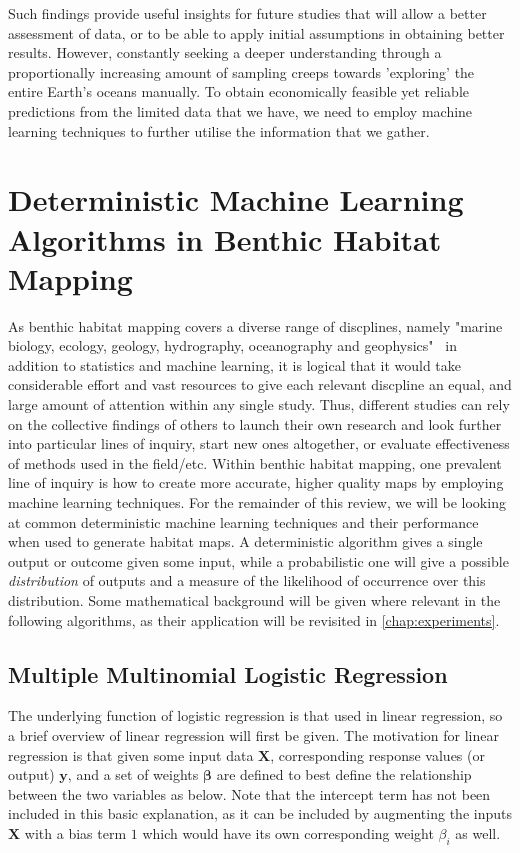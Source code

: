 Such findings provide useful insights for future studies that will allow a better assessment of data, or to be able to apply initial assumptions in obtaining better results. However, constantly seeking a deeper understanding through a proportionally increasing amount of sampling creeps towards 'exploring' the entire Earth's oceans manually. To obtain economically feasible yet reliable predictions from the limited data that we have, we need to employ machine learning techniques to further utilise the information that we gather.

\section{Deterministic Machine Learning Algorithms in Benthic Habitat Mapping}
As benthic habitat mapping covers a diverse range of discplines, namely "marine biology, ecology, geology, hydrography, oceanography and geophysics"~\citep{cjbrown11} in addition to statistics and machine learning, it is logical that it would take considerable effort and vast resources to give each relevant discpline an equal, and large amount of attention within any single study. Thus, different studies can rely on the collective findings of others to launch their own research and look further into particular lines of inquiry, start new ones altogether, or evaluate effectiveness of methods used in the field/etc. Within benthic habitat mapping, one prevalent line of inquiry is how to create more accurate, higher quality maps by employing machine learning techniques. For the remainder of this review, we will be looking at common deterministic machine learning techniques and their performance when used to generate habitat maps. A deterministic algorithm gives a single output or outcome given some input, while a probabilistic one will give a possible \textit{distribution} of outputs and a measure of the likelihood of occurrence over this distribution. Some mathematical background will be given where relevant in the following algorithms, as their application will be revisited in \autoref{chap:experiments}.

\subsection{Multiple Multinomial Logistic Regression}
The underlying function of logistic regression is that used in linear regression, so a brief overview of linear regression will first be given. The motivation for linear regression is that given some input data $\mathbf{X}$, corresponding response values (or output) $\mathbf{y}$, and a set of weights $\mathbf{\beta}$ are defined to best define the relationship between the two variables as below. Note that the intercept term has not been included in this basic explanation, as it can be included by augmenting the inputs $\mathbf{X}$ with a bias term $1$ which would have its own corresponding weight $\beta_i$ as well.

